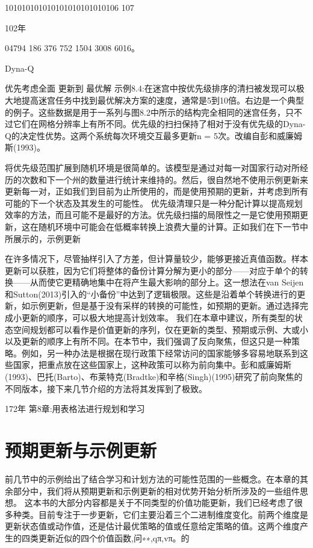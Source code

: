 101010101010101010101010106 107

102年

04794 186 376 752 1504 3008 6016。

Dyna-Q

优先考虑全面
更新到
最优解
示例8.4:在迷宫中按优先级排序的清扫被发现可以极大地提高迷宫任务中找到最优解决方案的速度，通常是5到10倍。右边是一个典型的例子。这些数据是用于一系列与图8.2中所示的结构完全相同的迷宫任务，只不过它们在网格分辨率上有所不同。优先级的扫扫保持了相对于没有优先级的Dyna-Q的决定性优势。这两个系统每次环境交互最多更新n = 5次。改编自彭和威廉姆斯(1993)。

将优先级范围扩展到随机环境是很简单的。该模型是通过对每一对国家行动对所经历的次数和下一个州的数量进行统计来维持的。然后，很自然地不使用示例更新来更新每一对，正如我们到目前为止所使用的，而是使用预期的更新，并考虑到所有可能的下一个状态及其发生的可能性。
优先级清理只是一种分配计算以提高规划效率的方法，而且可能不是最好的方法。优先级扫描的局限性之一是它使用预期更新，这在随机环境中可能会在低概率转换上浪费大量的计算。正如我们在下一节中所展示的，示例更新


在许多情况下，尽管抽样引入了方差，但计算量较少，能够更接近真值函数。样本更新可以获胜，因为它们将整体的备份计算分解为更小的部分——对应于单个的转换——从而使它更精确地集中在将产生最大影响的部分上。这一想法在van Seijen和Sutton(2013)引入的“小备份”中达到了逻辑极限。这些是沿着单个转换进行的更新，如示例更新，但是基于没有采样的转换的可能性，如预期的更新。通过选择完成小更新的顺序，可以极大地提高计划效率。
我们在本章中建议，所有类型的状态空间规划都可以看作是价值更新的序列，仅在更新的类型、预期或示例、大或小以及更新的顺序上有所不同。在本节中，我们强调了反向聚焦，但这只是一种策略。例如，另一种办法是根据在现行政策下经常访问的国家能够多容易地联系到这些国家，把重点放在这些国家上，这种政策可以称为前向集中。彭和威廉姆斯(1993)、巴托(Barto)、布莱特克(Bradtke)和辛格(Singh)(1995)研究了前向聚焦的不同版本，接下来几节介绍的方法将其发挥到了极致。

172年 					第8章:用表格法进行规划和学习


\section{预期更新与示例更新}

前几节中的示例给出了结合学习和计划方法的可能性范围的一些概念。在本章的其余部分中，我们将从预期更新和示例更新的相对优势开始分析所涉及的一些组件思想。
这本书的大部分内容都是关于不同类型的价值功能更新，我们已经考虑了很多种类。目前专注于一步更新，它们主要沿着三个二进制维度变化。前两个维度是更新状态值或动作值，还是估计最优策略的值或任意给定策略的值。这两个维度产生的四类更新近似的四个价值函数,问∗∗,qπ,vπ。的


